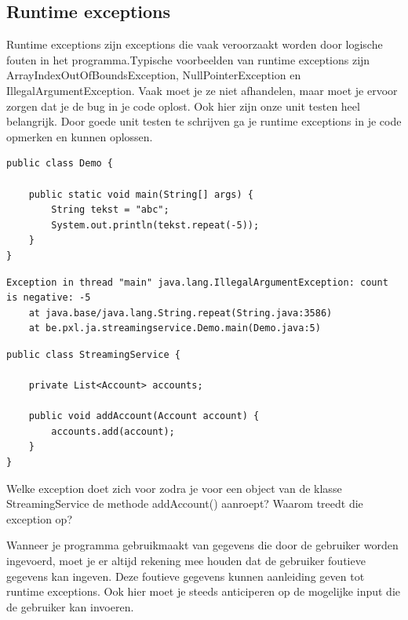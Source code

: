 \subsection{Runtime exceptions}

Runtime exceptions zijn exceptions die vaak veroorzaakt worden door logische fouten in het programma.Typische voorbeelden van runtime exceptions zijn ArrayIndexOutOfBoundsException, NullPointerException en IllegalArgumentException. Vaak moet je ze niet afhandelen, maar moet je ervoor zorgen dat je de bug in je code oplost. Ook hier zijn onze unit testen heel belangrijk. Door goede unit testen te schrijven ga je runtime exceptions in je code opmerken en kunnen oplossen.

\begin{lstlisting}
public class Demo {

	public static void main(String[] args) {
		String tekst = "abc";
		System.out.println(tekst.repeat(-5));
	}
}
\end{lstlisting}

\begin{verbatim}
Exception in thread "main" java.lang.IllegalArgumentException: count is negative: -5
	at java.base/java.lang.String.repeat(String.java:3586)
	at be.pxl.ja.streamingservice.Demo.main(Demo.java:5)
\end{verbatim}

\begin{oefening}

\begin{lstlisting}
public class StreamingService {

	private List<Account> accounts;

	public void addAccount(Account account) {
		accounts.add(account);
	}
}
\end{lstlisting}

Welke exception doet zich voor zodra je voor een object van de klasse StreamingService de methode addAccount() aanroept? Waarom treedt die exception op?
\end{oefening}

Wanneer je programma gebruikmaakt van gegevens die door de gebruiker worden ingevoerd, moet je er altijd rekening mee houden dat de gebruiker foutieve gegevens kan ingeven. Deze foutieve gegevens kunnen aanleiding geven tot runtime exceptions. Ook hier moet je steeds anticiperen op de mogelijke input die de gebruiker kan invoeren. 


